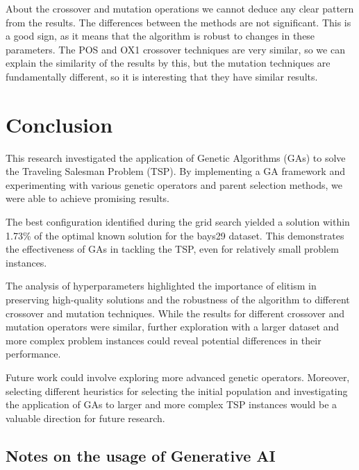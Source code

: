 \documentclass[11pt]{article}
\begin{document}
About the crossover and mutation operations we cannot deduce any clear pattern from the results. The differences between the methods are not significant. This is a good sign, as it means that the algorithm is robust to changes in these parameters. The POS and OX1 crossover techniques are very similar, so we can explain the similarity of the results by this, but the mutation techniques are fundamentally different, so it is interesting that they have similar results. 

\section{Conclusion}

This research investigated the application of Genetic Algorithms (GAs) to solve the Traveling Salesman Problem (TSP). By implementing a GA framework and experimenting with various genetic operators and parent selection methods, we were able to achieve promising results.

The best configuration identified during the grid search yielded a solution within 1.73\% of the optimal known solution for the bays29 dataset. This demonstrates the effectiveness of GAs in tackling the TSP, even for relatively small problem instances.

The analysis of hyperparameters highlighted the importance of elitism in preserving high-quality solutions and the robustness of the algorithm to different crossover and mutation techniques. While the results for different crossover and mutation operators were similar, further exploration with a larger dataset and more complex problem instances could reveal potential differences in their performance.

Future work could involve exploring more advanced genetic operators. Moreover, selecting different heuristics for selecting the initial population and investigating the application of GAs to larger and more complex TSP instances would be a valuable direction for future research.

\subsection{Notes on the usage of Generative AI}
\end{document}
